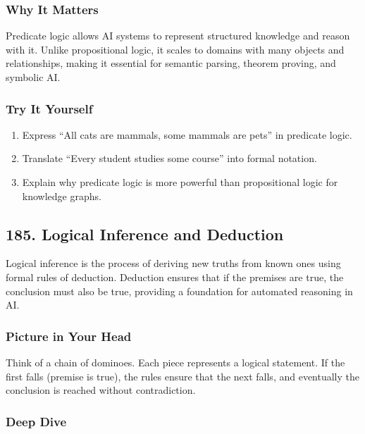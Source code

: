 \documentclass[
  letterpaper,
  DIV=11,
  numbers=noendperiod]{scrreprt}
\providecommand{\tightlist}{%
  \setlength{\itemsep}{0pt}\setlength{\parskip}{0pt}}
\begin{document}
\subsubsection{Why It Matters}\label{why-it-matters-81}

Predicate logic allows AI systems to represent structured knowledge and
reason with it. Unlike propositional logic, it scales to domains with
many objects and relationships, making it essential for semantic
parsing, theorem proving, and symbolic AI.

\subsubsection{Try It Yourself}\label{try-it-yourself-183}

\begin{enumerate}
\def\labelenumi{\arabic{enumi}.}
\tightlist
\item
  Express ``All cats are mammals, some mammals are pets'' in predicate
  logic.
\item
  Translate ``Every student studies some course'' into formal notation.
\item
  Explain why predicate logic is more powerful than propositional logic
  for knowledge graphs.
\end{enumerate}

\subsection{185. Logical Inference and
Deduction}\label{logical-inference-and-deduction}

Logical inference is the process of deriving new truths from known ones
using formal rules of deduction. Deduction ensures that if the premises
are true, the conclusion must also be true, providing a foundation for
automated reasoning in AI.

\subsubsection{Picture in Your Head}\label{picture-in-your-head-184}

Think of a chain of dominoes. Each piece represents a logical statement.
If the first falls (premise is true), the rules ensure that the next
falls, and eventually the conclusion is reached without contradiction.

\subsubsection{Deep Dive}\label{deep-dive-184}
\end{document}
